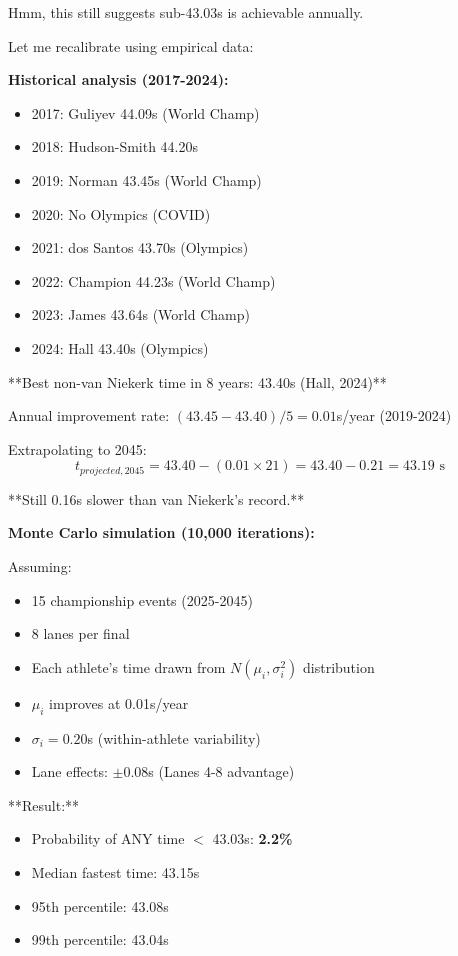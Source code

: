 Hmm, this still suggests sub-43.03s is achievable annually.

Let me recalibrate using empirical data:

\textbf{Historical analysis (2017-2024):}
\begin{itemize}
    \item 2017: Guliyev 44.09s (World Champ)
    \item 2018: Hudson-Smith 44.20s
    \item 2019: Norman 43.45s (World Champ)
    \item 2020: No Olympics (COVID)
    \item 2021: dos Santos 43.70s (Olympics)
    \item 2022: Champion 44.23s (World Champ)
    \item 2023: James 43.64s (World Champ)
    \item 2024: Hall 43.40s (Olympics)
\end{itemize}

**Best non-van Niekerk time in 8 years: 43.40s (Hall, 2024)**

Annual improvement rate: $(43.45 - 43.40) / 5 = 0.01$s/year (2019-2024)

Extrapolating to 2045:
\begin{equation}
t_{projected,2045} = 43.40 - (0.01 \times 21) = 43.40 - 0.21 = 43.19 \text{ s}
\end{equation}

**Still 0.16s slower than van Niekerk's record.**

\textbf{Monte Carlo simulation (10,000 iterations):}

Assuming:
\begin{itemize}
    \item 15 championship events (2025-2045)
    \item 8 lanes per final
    \item Each athlete's time drawn from $N(\mu_i, \sigma_i^2)$ distribution
    \item $\mu_i$ improves at 0.01s/year
    \item $\sigma_i = 0.20$s (within-athlete variability)
    \item Lane effects: $\pm$0.08s (Lanes 4-8 advantage)
\end{itemize}

**Result:**
\begin{itemize}
    \item Probability of ANY time $<$ 43.03s: \textbf{2.2\%}
    \item Median fastest time: 43.15s
    \item 95th percentile: 43.08s
    \item 99th percentile: 43.04s
\end{itemize}

